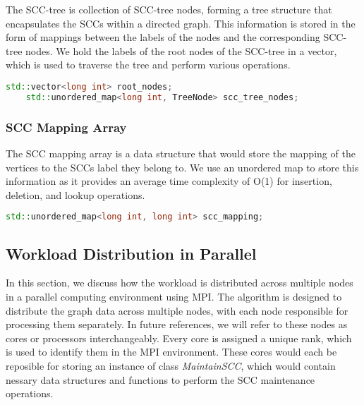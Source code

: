The SCC-tree is collection of SCC-tree nodes, forming a tree structure that encapsulates the SCCs within a directed graph.
This information is stored in the form of mappings between the labels of the nodes and the corresponding SCC-tree nodes.
We hold the labels of the root nodes of the SCC-tree in a vector, which is used to traverse the tree and perform various operations.

\begin{lstlisting}[language=C++, label={lst:scc_tree}]
    std::vector<long int> root_nodes;
    std::unordered_map<long int, TreeNode> scc_tree_nodes;
\end{lstlisting}

\subsubsection{SCC Mapping Array}\label{Subsubsec: SCC Mapping Array DS}
The SCC mapping array is a data structure that would store the mapping of the vertices to the SCCs label they belong to.
We use an unordered map to store this information as it provides an average time complexity of O(1) for insertion, deletion, and lookup operations.
\begin{lstlisting}[language=C++, label={lst:scc_mapping_array}]
    std::unordered_map<long int, long int> scc_mapping;
\end{lstlisting}

\subsection{Workload Distribution in Parallel}\label{Subsec: Workload Distribution in Parallel}
In this section, we discuss how the workload is distributed across multiple nodes in a parallel computing environment using MPI.
The algorithm is designed to distribute the graph data across multiple nodes, with each node responsible for processing them separately.
In future references, we will refer to these nodes as cores or processors interchangeably. Every core is assigned a unique rank, which is used to identify them in the MPI environment.
These cores would each be reposible for storing an instance of class \textit{MaintainSCC}, which would contain nessary data structures and functions to perform the SCC maintenance operations.

